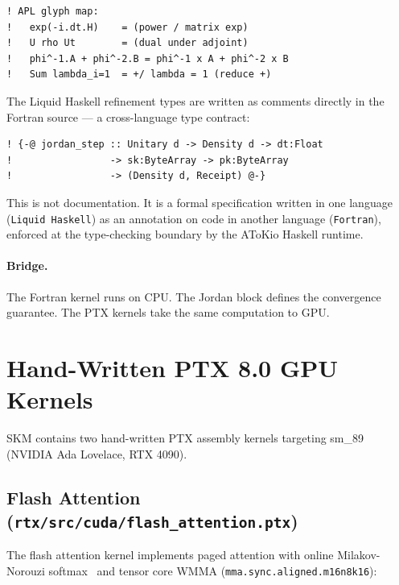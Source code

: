 \documentclass[11pt,a4paper]{article}
\begin{document}
\begin{lstlisting}[language={}]
! APL glyph map:
!   exp(-i.dt.H)    = (power / matrix exp)
!   U rho Ut        = (dual under adjoint)
!   phi^-1.A + phi^-2.B = phi^-1 x A + phi^-2 x B
!   Sum lambda_i=1  = +/ lambda = 1 (reduce +)
\end{lstlisting}

The Liquid Haskell refinement types are written as comments directly
in the Fortran source --- a cross-language type contract:

\begin{lstlisting}[language={}]
! {-@ jordan_step :: Unitary d -> Density d -> dt:Float
!                 -> sk:ByteArray -> pk:ByteArray
!                 -> (Density d, Receipt) @-}
\end{lstlisting}

This is not documentation. It is a formal specification written in one
language (\texttt{Liquid Haskell}) as an annotation on code in another
language (\texttt{Fortran}), enforced at the type-checking boundary by
the AToKio Haskell runtime.

\paragraph{Bridge.} The Fortran kernel runs on CPU. The Jordan block
defines the convergence guarantee. The PTX kernels take the same
computation to GPU.

\section{Hand-Written PTX 8.0 GPU Kernels}

SKM contains two hand-written PTX assembly kernels targeting sm\_89
(NVIDIA Ada Lovelace, RTX 4090).

\subsection{Flash Attention (\texttt{rtx/src/cuda/flash\_attention.ptx})}

The flash attention kernel implements paged attention with online
Milakov-Norouzi softmax~\cite{milakov2018} and tensor core WMMA
(\texttt{mma.sync.aligned.m16n8k16}):
\end{document}
